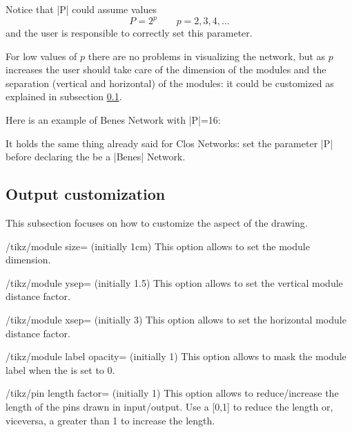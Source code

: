 \documentclass{ltxdoc} %
\begin{document}
Notice that |P| could assume values
\[P=2^p \qquad p=2,3,4,\ldots\]
and the user is responsible to correctly set this parameter.

For low values of $p$ there are no problems in visualizing the network, but as $p$ increases the user should take care of the dimension of the modules and the separation (vertical and horizontal) of the modules: it could be customized as explained in subsection \ref{subsec:customization}.

Here is an example of Benes Network with |P|=16:
\begin{codeexample}[]
\begin{tikzpicture}
    \node[P=16,benes] {};
\end{tikzpicture}
\end{codeexample}

It holds the same thing already said for Clos Networks: set the parameter |P| before declaring the  be a |Benes| Network.


\subsection{Output customization}
\label{subsec:customization}
This subsection focuses on how to customize the aspect of the drawing.

\begin{key}{/tikz/module size= (initially 1cm)}
    This option allows to set the module dimension.
\end{key}

\begin{key}{/tikz/module ysep= (initially 1.5)}
    This option allows to set the vertical module distance factor.
\end{key}

\begin{key}{/tikz/module xsep= (initially 3)}
    This option allows to set the horizontal module distance factor.
\end{key}

\begin{key}{/tikz/module label opacity= (initially 1)}
    This option allows to mask the module label when the  is set to 0.
\end{key}

\begin{key}{/tikz/pin length factor= (initially 1)}
    This option allows to reduce/increase the length of the pins drawn in input/output. Use a  [0,1] to reduce the length or, viceversa, a  greater than 1 to increase the length.
\end{key}
\end{document}
